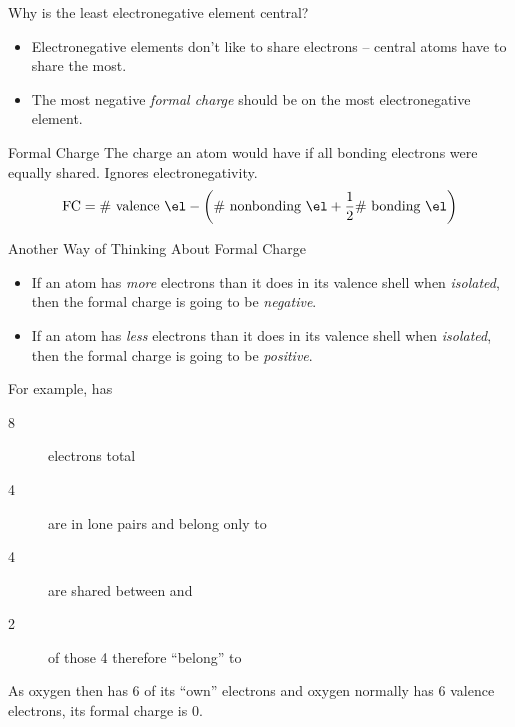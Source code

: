 \documentclass[notes=hide]{beamer}
\begin{document}
\begin{frame}{Why is the least electronegative element central?}
	\begin{itemize}
		\item Electronegative elements don't like to share electrons --
			central atoms have to share the most.
		\item The most negative \emph{formal charge} should be on the
			most electronegative element.
	\end{itemize}

	\begin{block}{Formal Charge}
		The charge an atom would have if all bonding electrons were
		equally shared. Ignores electronegativity.
		\begin{equation*}
			\text{FC} = \text{\# valence \el} -
			\left(\text{\# nonbonding \el} + \frac{1}{2}\text{\# bonding
			\el}\right)
		\end{equation*}
	\end{block}
\end{frame}

\begin{frame}{Another Way of Thinking About Formal Charge}
	\begin{itemize}
		\item If an atom has \emph{more} electrons than it does in its
			valence shell when \emph{isolated}, then the formal
			charge is going to be \emph{negative}.
		\item If an atom has \emph{less} electrons than it does in its
			valence shell when \emph{isolated}, then the formal
			charge is going to be \emph{positive}.
	\end{itemize}


	\noindent
	For example,  has
	\begin{description}
		\item[8] electrons total
		\item[4] are in lone pairs and belong only to 
		\item[4] are shared between  and 
		\item[2] of those 4 therefore ``belong'' to 
	\end{description}
	As oxygen then has 6 of its ``own'' electrons and oxygen
	normally has 6 valence electrons, its formal charge is 0.
\end{frame}
\end{document}
